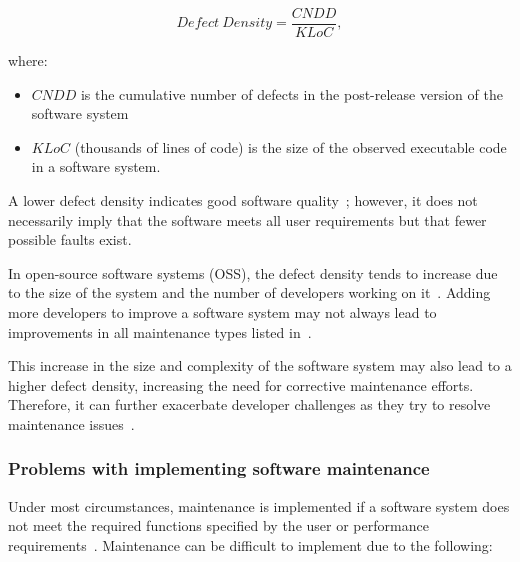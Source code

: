 \begin{equation}
	\label{eq:ch1_defectDensity}
	Defect~Density = \frac{CNDD}{KLoC},
\end{equation}

where:

\begin{itemize}
	\item $CNDD$ is the cumulative number of defects in the post-release version of the software system
	\item $KLoC$ (thousands of lines of code) is the size of the observed executable code in a software system. 
\end{itemize}

A lower defect density indicates good software quality~\cite{Shah2012, Alenezi2016}; however, it does not necessarily imply that the software meets all user requirements but that fewer possible faults exist.\par In open-source software systems (OSS), the defect density tends to increase due to the size of the system and the number of developers working on it~\cite{Rahmani2010}. Adding more developers to improve a software system may not always lead to improvements in all maintenance types listed in~.\par This increase in the size and complexity of the software system may also lead to a higher defect density, increasing the need for corrective maintenance efforts. Therefore, it can further exacerbate developer challenges as they try to resolve maintenance issues~\cite{Alenezi2016}.

\subsubsection{Problems with implementing software maintenance}\label{sec:ch1_maintenanceProblems}
Under most circumstances, maintenance is implemented if a software system does not meet the required functions specified by the user or performance requirements~\cite{Ogheneovo2014, Sneed2004}. Maintenance can be difficult to implement due to the following:

